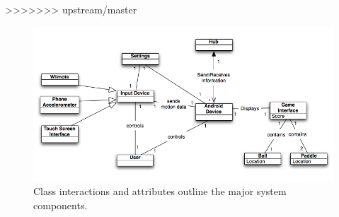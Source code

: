 \documentclass[12pt]{article}
\begin{document}
>>>>>>> upstream/master
\begin{figure}
\begin{center}
\includegraphics[scale=.7]{DomainModel.png}
\caption{\label{domainModel}Class interactions and attributes outline the major system components.}
\end{center}
\end{figure}



\end{document}
